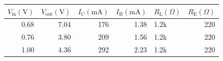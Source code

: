 \begin{tabular}{rrrrlr}
\toprule
\(V_\text{in} (\text{V})\) & \(V_\text{out} (\text{V})\) & \(I_\text{C} (\text{mA})\) & \(I_\text{B} (\text{mA})\) & \(R_\text{L} (\Omega)\) & \(R_\text{E} (\Omega)\) \\
\midrule
0.68 & 7.04 & 176 & 1.38 & 1.2k & 220 \\
0.76 & 3.80 & 209 & 1.56 & 1.2k & 220 \\
1.00 & 4.36 & 292 & 2.23 & 1.2k & 220 \\
\bottomrule
\end{tabular}
